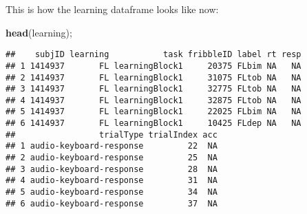 \documentclass[
]{article}
\newenvironment{Shaded}{\begin{snugshade}}{\end{snugshade}}
\newcommand{\KeywordTok}[1]{\textcolor[rgb]{0.13,0.29,0.53}{\textbf{#1}}}
\newcommand{\NormalTok}[1]{#1}
\newcommand{\OperatorTok}[1]{\textcolor[rgb]{0.81,0.36,0.00}{\textbf{#1}}}
\newcommand{\StringTok}[1]{\textcolor[rgb]{0.31,0.60,0.02}{#1}}
\begin{document}
\begin{Shaded}
\end{Shaded}

This is how the learning dataframe looks like now:

\begin{Shaded}
\begin{Highlighting}[]
\KeywordTok{head}\NormalTok{(learning);}
\end{Highlighting}
\end{Shaded}

\begin{verbatim}
##    subjID learning           task fribbleID label rt resp
## 1 1414937       FL learningBlock1     20375 FLbim NA   NA
## 2 1414937       FL learningBlock1     31075 FLtob NA   NA
## 3 1414937       FL learningBlock1     32775 FLtob NA   NA
## 4 1414937       FL learningBlock1     32875 FLtob NA   NA
## 5 1414937       FL learningBlock1     22025 FLbim NA   NA
## 6 1414937       FL learningBlock1     10425 FLdep NA   NA
##                 trialType trialIndex acc
## 1 audio-keyboard-response         22  NA
## 2 audio-keyboard-response         25  NA
## 3 audio-keyboard-response         28  NA
## 4 audio-keyboard-response         31  NA
## 5 audio-keyboard-response         34  NA
## 6 audio-keyboard-response         37  NA
\end{verbatim}
\end{document}
